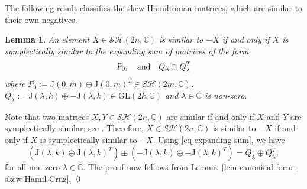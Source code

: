 \documentclass[11pt,reqno]{amsart}
\renewenvironment{proof}{{\bfseries Proof.}}{\qed}
\numberwithin{equation}{section}
\newtheorem{lemma}[theorem]{Lemma}
\theoremstyle{definition}
\def\C{\mathbb C}
\def\C{\mathbb {C}}
\newcommand{\lemref}[1]{Lemma~\ref{#1}}
\begin{document}
The following result classifies the skew-Hamiltonian matrices, which are similar to their own negatives.
\begin{lemma}\label{lem-skew-sim-neg-class}
An element  $X \in \mathcal{SH}(2n,\C)$ is similar to $-X$ if and only if $X$ is symplectically similar to the expanding sum of matrices of the form
	\begin{equation}\label{eq-form-skew-sim-neg}
		P_{0}, \quad
		\hbox{and} \quad Q_{\lambda}\oplus Q_{\lambda}^{T}
	\end{equation}
	where $P_{0}	:=
	\mathrm{J}(0, m) \oplus
	\mathrm{J}(0, m)^{T} \in \mathcal{SH}(2m,\C)$, $Q_{\lambda} := \mathrm{J}(\lambda, k)  \oplus - \mathrm{J}(\lambda, k) \in \mathrm{GL}(2k,\C)$ and $\lambda \in \C$ is non-zero.
\end{lemma}
\begin{proof}
Note that two matrices $X, Y \in \mathcal{SH}(2n,\C)$  are similar if and only if $X$ and $Y$ are symplectically similar; see {\cite[Corollary 22]{HM}}.  Therefore,  $X \in \mathcal{SH}(2n,\C)$ is similar to $-X$ if and only if $X $ is symplectically similar to $-X$.  Using \eqref{eq-expanding-sum}, we have  
	\begin{equation*}
		(	\mathrm{J}(\lambda, k)  \oplus  \mathrm{J}(\lambda, k)^{T}  )  \boxplus 	(-\mathrm{J}(\lambda, k)  \oplus  -\mathrm{J}(\lambda, k)^{T} ) = Q_{\lambda}\oplus Q_{\lambda}^{T},
	\end{equation*}
	for all non-zero $\lambda \in \C$. The proof now follows from \lemref{lem-canonical-form-skew-Hamil-Cruz}.
\end{proof}
\end{document}
